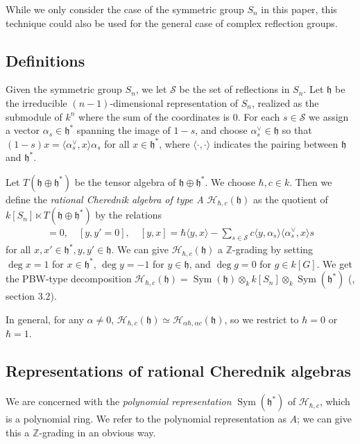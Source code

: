 \documentclass{article}
\numberwithin{equation}{section}
\newcommand{\h}{\mathfrak{h}}
\newcommand{\HH}{\mathcal{H}}
\newcommand{\Sym}{\operatorname{Sym}}
\begin{document}
While we only consider the case of the symmetric group $S_n$ in this paper, this technique could also be used for the general case of complex reflection groups. %


\subsection{Definitions}

Given the symmetric group $S_n$, we let $\mathcal{S}$ be the set of reflections in $S_n$. Let $\h$ be the irreducible $(n-1)$-dimensional representation of $S_n$, realized as the submodule of $k^n$ where the sum of the coordinates is $0$. For each $s \in \mathcal{S}$ we assign a vector $\alpha_s \in \h^*$ spanning the image of $1-s$, and choose $\alpha_s^\vee \in \h$ so that $(1-s)x=\langle \alpha_s^\vee,x\rangle \alpha_s$ for all $x \in \h^*$, where $\langle \cdot,\cdot\rangle$ indicates the pairing between $\h$ and $\h^*$. 

Let $T(\h \oplus \h^*)$ be the tensor algebra of $\h \oplus \h^*$. We choose $\hbar,c \in k$. Then we define the {\it rational Cherednik algebra of type A $\HH_{\hbar,c}(\h)$} as the quotient of $k[S_n] \ltimes T(\h \oplus \h^*)$ by the relations
\begin{align*}
[x,x']=0, \quad [y,y' = 0], \quad [y,x] = \hbar\langle y,x\rangle - \sum_{s \in \mathcal{S}} c\langle y,\alpha_s\rangle\langle \alpha_s^\vee,x\rangle s
\end{align*}
 for all $x,x' \in \h^*, y,y' \in \h$. We can give $\HH_{\hbar,c}(\h)$ a $\mathbb{Z}$-grading by setting $\deg x=1$ for $x \in \h^*$, $\deg y = -1$ for $y \in \h$, and $\deg g=0$ for $g \in k[G]$. We get the PBW-type decomposition $\HH_{\hbar,c}(\h)=\Sym(\h) \otimes_k k[S_n] \otimes_k \Sym(\h^*)$ (\cite{EM}, section 3.2). 

In general, for any $\alpha \ne 0$, $\HH_{\hbar,c}(\h)\simeq \HH_{\alpha\hbar,\alpha c}(\h)$, so we restrict to $\hbar=0$ or $\hbar = 1$. 

\subsection{Representations of rational Cherednik algebras}

We are concerned with the {\it polynomial representation} $\Sym(\h^*)$ of $\HH_{\hbar,c}$, which is a polynomial ring. We refer to the polynomial representation as $A$; we can give this a $\mathbb{Z}$-grading in an obvious way. 
\end{document}

